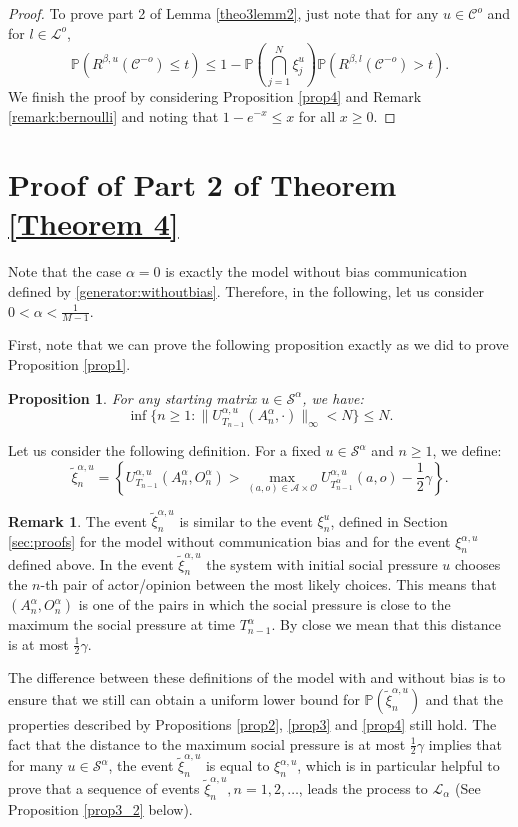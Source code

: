 \documentclass[11pt]{article}
\newtheorem{proposition}[theorem]{Proposition}
\theoremstyle{definition}
\newtheorem{remark}{Remark}
\newcommand{\st}{\mathcal{S}}
\def\P{{\mathbb P}}
\begin{document}
\begin{proof}
To prove part 2 of Lemma \ref{theo3lemm2}, just note that for any $u \in \mathcal{C}^o$ and for $l\in \mathcal{L}^o$,
$$
\P(R^{\beta,u}(\mathcal{C}^{-o}) \leq t) \leq 1-
\P\left(\bigcap_{j=1}^{N}\xi^{u}_j\right)\mathbb{P}(R^{\beta,l}(\mathcal{C}^{-o})>t).
$$
We finish the proof by considering Proposition \ref{prop4} and Remark \ref{remark:bernoulli} and noting that $1-e^{-x}\leq x$ for all $x \geq 0$.
\end{proof}

\section{Proof of Part 2 of Theorem \ref{Theorem 4}} \label{ap:part2theorem4}
Note that the case $\alpha=0$ is exactly the model without bias communication defined by \eqref{generator:withoutbias}. Therefore, in the following, let us consider $0 < \alpha < \frac{1}{M-1}$.

First, note that we can prove the following proposition exactly as we did to prove Proposition \ref{prop1}.
\begin{proposition}\label{prop1_2}
    For any starting matrix $u\in\st^{\alpha}$, we have:
    $$
        \inf\{n\geq 1: \|U^{\alpha,u}_{T_{n-1}}(A_n^{\alpha},\cdot)\|_\infty<N \} \leq N.
    $$
\end{proposition}

Let us consider the following definition.
For a fixed $u\in\st^{\alpha}$ and $n\geq 1$, we define:
$$
\tilde{\xi}_n^{\alpha,u}=\left\{U^{\alpha,u}_{T_{n-1}}(A_n^{\alpha},O_n^{\alpha}) >\max_{(a,o)\in\mathcal{A}\times\mathcal{O}}U^{\alpha,u}_{T_{n-1}^{\alpha}}(a,o)-\frac{1}{2}\gamma\right\}. 
$$

\begin{remark} 
The event $\tilde{\xi}_n^{\alpha,u}$ is similar to the event $\xi_n^u$, defined in Section \ref{sec:proofs} for the model without communication bias and for the event $\xi_n^{\alpha,u}$ defined above. In the event $\tilde{\xi}_n^{\alpha,u}$ the system with initial social pressure $u$ chooses the $n$-th pair of actor/opinion between the most likely choices. This means that $(A_n^{\alpha},O_n^{\alpha})$ is one of the pairs in which the social pressure is close to the maximum the social pressure at time $T_{n-1}^{\alpha}$. By close we mean that this distance is at most $\frac{1}{2}\gamma$. 

The difference between these definitions of the model with and without bias is to ensure that we still can obtain a uniform lower bound for $\P(\tilde{\xi}_n^{\alpha,u})$ and that the properties described by Propositions \ref{prop2}, \ref{prop3} and \ref{prop4} still hold. The fact that the distance to the maximum social pressure is at most $\frac{1}{2}\gamma$ implies that for many $u\in \st^{\alpha}$, the event $\tilde{\xi}_n^{\alpha,u}$ is equal to $\xi_n^{\alpha,u}$, which is in particular helpful to prove that a sequence of events $\tilde{\xi}_n^{\alpha,u}, n=1,2,\ldots$, leads the process to $\mathcal{L}_{\alpha}$ (See Proposition \ref{prop3_2} below).
\end{remark}
\end{document}
